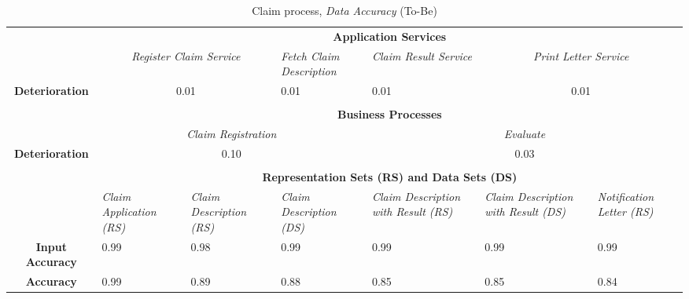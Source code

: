 \begin{center}
\begin{table}[H]
\begin{tabular}{c|p{1.5cm}|p{1.5cm}|p{1.5cm}|p{1.5cm}|p{1.5cm}|p{1.7cm}|}


\cline{2-7}

	& \multicolumn{6}{c|}{\textbf{Application Services}} \\ \cline{2-7}
	& \multicolumn{2}{c|}{\textsl{Register Claim Service}} & \textsl{Fetch Claim Description} & \textsl{Claim Result Service} & \multicolumn{2}{c|}{\textsl{Print Letter Service}} \\ \hline
	\multicolumn{1}{|c|}{\textbf{Deterioration}} & \multicolumn{2}{c|}{0.01} & 0.01 & 0.01 & \multicolumn{2}{c|}{0.01} \\ \hline

	\multicolumn{7}{c}{} \\ \cline{2-7}
	& \multicolumn{6}{c|}{\textbf{Business Processes}} \\ \cline{2-7}
	& \multicolumn{3}{c|}{\textsl{Claim Registration}} & \multicolumn{3}{c|}{\textsl{Evaluate}} \\ \hline
	\multicolumn{1}{|c|}{\textbf{Deterioration}} & \multicolumn{3}{c|}{0.10} & \multicolumn{3}{c|}{0.03} \\ \hline

	
	\multicolumn{7}{c}{} \\ \cline{2-7}
	 & \multicolumn{6}{c|}{\textbf{Representation Sets (RS) and Data Sets (DS)}} \\ \cline{2-7}
	 & \textsl{Claim Application (RS)} & \textsl{Claim Description (RS)} & \textsl{Claim Description (DS)} & \textsl{Claim Description with Result (RS)} & \textsl{Claim Description with Result (DS)} & \textsl{Notification Letter (RS)}\\
	\hline
	\multicolumn{1}{|c|}{\textbf{Input Accuracy}} & 0.99 & 0.98 & 0.99 & 0.99 & 0.99 & 0.99\\ \hline
	\multicolumn{1}{|c|}{\textbf{Accuracy}} & 0.99 & 0.89 & 0.88 & 0.85 & 0.85 & 0.84\\ \hline
\end{tabular}
\caption{Claim process, \textsl{Data Accuracy} (To-Be)}
\label{tab:claim_to_be}
\end{table}
\end{center}